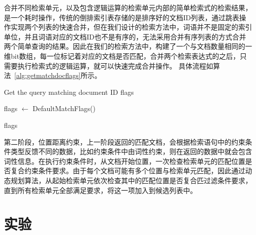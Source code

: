 \documentclass[11pt]{article}
\begin{document}
\begin{CJK*}{UTF8}{gbsn}
合并不同检索单元，以及包含逻辑运算的检索单元内部的简单检索式的检索结果，是一个耗时操作，传统的倒排索引表存储的是排序好的文档ID列表，通过跳表操作实现两个列表的快速合并，但在我们设计的检索方法中，词语并不是固定的索引单位，并且词语对应的文档ID也不是有序的，无法采用合并有序列表的方式合并两个简单查询的结果。因此在我们的检索方法中，构建了一个与文档数量相同的一维bit数组，每一位标记着对应的文档是否匹配，合并两个检索表达式的之后，只需要执行检索式的逻辑运算，就可以快速完成合并操作。 
具体流程如算法~\ref{alg:getmatchdocflags}所示。

\begin{algorithm}[H]
	\caption{Get the query matching document ID flags}
	\label{alg:getmatchdocflags}
	\DontPrintSemicolon
	
		
	
	\;
flags $\leftarrow$ DefaultMatchFlags()\;
	
	\KwRet flags\;
\end{algorithm}

第二阶段，位置距离约束，上一阶段返回的匹配文档，会根据检索语句中的约束条件类型反馈不同的数据，比如约束条件中由词性约束，则在返回的数据中就会包含词性信息。在执行约束条件时，从文档开始位置，一次检查检索单元的匹配位置是否复合约束条件要求。由于每个文档可能有多个位置与检索单元匹配，因此通过动态规划算法，从起始检索单元依次检查其中的匹配位置是否复合匹过滤条件要求，直到所有检索单元全部满足要求，将这一项加入到候选列表中。

\section{实验}


\end{CJK*}
\end{document}
